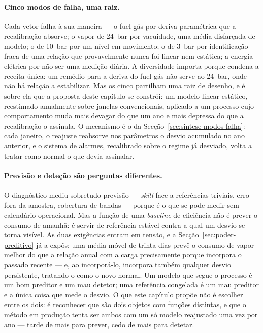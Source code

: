 \paragraph{Cinco modos de falha, uma raiz.} Cada vetor falha à sua maneira
--- o fuel gás por deriva paramétrica que a recalibração absorve; o vapor de
24~bar por vacuidade, uma média disfarçada de modelo; o de 10~bar por um
nível em movimento; o de 3~bar por identificação fraca de uma relação que
provavelmente nunca foi linear nem estática; a energia elétrica por não ser
uma medição diária. A diversidade importa porque condena a receita única: um
remédio para a deriva do fuel gás não serve ao 24~bar, onde não há relação a
estabilizar. Mas os cinco partilham uma raiz de desenho, e é sobre ela que a
proposta deste capítulo se constrói: um modelo linear estático, reestimado
anualmente sobre janelas convencionais, aplicado a um processo cujo
comportamento muda mais devagar do que um ano e mais depressa do que a
recalibração o assinala. O mecanismo é o da Secção~\ref{sec:sintese-modos-falha}:
cada janeiro, o reajuste reabsorve nos parâmetros o desvio acumulado no ano
anterior, e o sistema de alarmes, recalibrado sobre o regime já desviado,
volta a tratar como normal o que devia assinalar.

\paragraph{Previsão e deteção são perguntas diferentes.} O diagnóstico mediu
sobretudo previsão --- \emph{skill} face a referências triviais, erro fora
da amostra, cobertura de bandas --- porque é o que se pode medir sem
calendário operacional. Mas a função de uma \emph{baseline} de eficiência
não é prever o consumo de amanhã: é servir de referência estável contra a
qual um desvio se torna visível. As duas exigências entram em tensão, e a
Secção~\ref{sec:poder-preditivo} já a expôs: uma média móvel de trinta dias
prevê o consumo de vapor melhor do que a relação anual com a carga
precisamente porque incorpora o passado recente --- e, ao incorporá-lo,
incorpora também qualquer desvio persistente, tratando-o como o novo
normal. Um modelo que segue o processo é um bom preditor e um mau detetor;
uma referência congelada é um mau preditor e a única coisa que mede o
desvio. O que este capítulo propõe não é escolher entre os dois: é
reconhecer que são dois objetos com funções distintas, e que o método em
produção tenta ser ambos com um só modelo reajustado uma vez por ano ---
tarde de mais para prever, cedo de mais para detetar.

